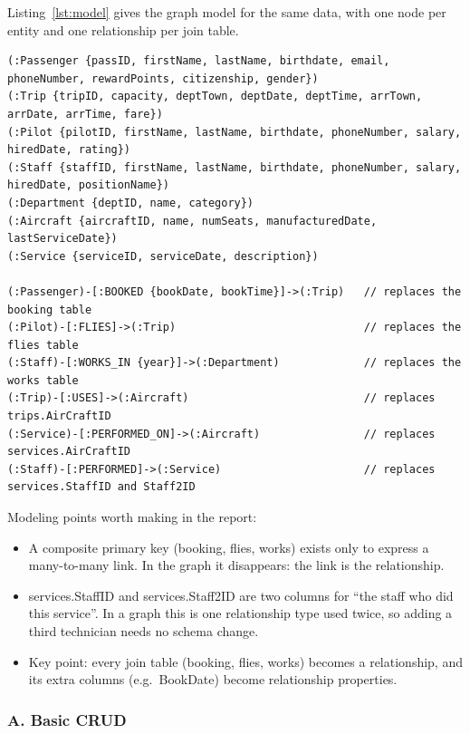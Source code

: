 \documentclass[10pt,a4paper,twocolumn]{article}
\begin{document}
Listing~\ref{lst:model} gives the graph model for the same data, with one node per entity and one relationship per join table.

\begin{lstlisting}[caption={Property graph model for the el\_paso\_airport data},label={lst:model}]
(:Passenger {passID, firstName, lastName, birthdate, email, phoneNumber, rewardPoints, citizenship, gender})
(:Trip {tripID, capacity, deptTown, deptDate, deptTime, arrTown, arrDate, arrTime, fare})
(:Pilot {pilotID, firstName, lastName, birthdate, phoneNumber, salary, hiredDate, rating})
(:Staff {staffID, firstName, lastName, birthdate, phoneNumber, salary, hiredDate, positionName})
(:Department {deptID, name, category})
(:Aircraft {aircraftID, name, numSeats, manufacturedDate, lastServiceDate})
(:Service {serviceID, serviceDate, description})

(:Passenger)-[:BOOKED {bookDate, bookTime}]->(:Trip)   // replaces the booking table
(:Pilot)-[:FLIES]->(:Trip)                             // replaces the flies table
(:Staff)-[:WORKS_IN {year}]->(:Department)             // replaces the works table
(:Trip)-[:USES]->(:Aircraft)                           // replaces trips.AirCraftID
(:Service)-[:PERFORMED_ON]->(:Aircraft)                // replaces services.AirCraftID
(:Staff)-[:PERFORMED]->(:Service)                      // replaces services.StaffID and Staff2ID
\end{lstlisting}

Modeling points worth making in the report:

\begin{itemize}
  \item A composite primary key (booking, flies, works) exists only to express a many-to-many link. In the graph it disappears: the link is the relationship.
  \item services.StaffID and services.Staff2ID are two columns for ``the staff who did this service''. In a graph this is one relationship type used twice, so adding a third technician needs no schema change.
  \item Key point: every join table (booking, flies, works) becomes a relationship, and its extra columns (e.g.\ BookDate) become relationship properties.
\end{itemize}

\subsubsection*{A. Basic CRUD}
\end{document}
